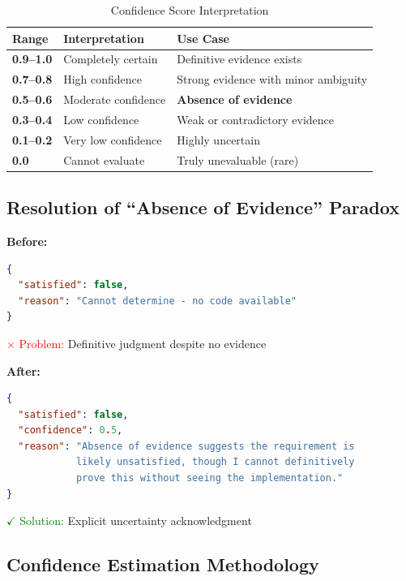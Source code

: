 \documentclass[11pt,a4paper]{article}
\begin{document}
\begin{table}[H]
\centering
\caption{Confidence Score Interpretation}
\begin{tabularx}{\textwidth}{lXX}
\toprule
\textbf{Range} & \textbf{Interpretation} & \textbf{Use Case} \\
\midrule
\textbf{0.9--1.0} & Completely certain & Definitive evidence exists \\
\textbf{0.7--0.8} & High confidence & Strong evidence with minor ambiguity \\
\textbf{0.5--0.6} & Moderate confidence & \textbf{Absence of evidence} \\
\textbf{0.3--0.4} & Low confidence & Weak or contradictory evidence \\
\textbf{0.1--0.2} & Very low confidence & Highly uncertain \\
\textbf{0.0} & Cannot evaluate & Truly unevaluable (rare) \\
\bottomrule
\end{tabularx}
\label{tab:confidence-scale}
\end{table}

\subsection{Resolution of ``Absence of Evidence'' Paradox}

\textbf{Before:}
\begin{lstlisting}[language=json, caption={Original System Output}]
{
  "satisfied": false,
  "reason": "Cannot determine - no code available"
}
\end{lstlisting}

\textcolor{red}{$\times$ Problem:} Definitive judgment despite no evidence

\vspace{1em}

\textbf{After:}
\begin{lstlisting}[language=json, caption={Improved System Output}]
{
  "satisfied": false,
  "confidence": 0.5,
  "reason": "Absence of evidence suggests the requirement is 
            likely unsatisfied, though I cannot definitively 
            prove this without seeing the implementation."
}
\end{lstlisting}

\textcolor{green}{$\checkmark$ Solution:} Explicit uncertainty acknowledgment

\subsection{Confidence Estimation Methodology}
\end{document}
